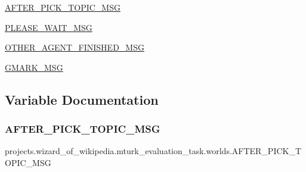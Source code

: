 \begin{DoxyCompactItemize}
\item 
\hyperlink{namespaceprojects_1_1wizard__of__wikipedia_1_1mturk__evaluation__task_1_1worlds_aa0e1a342f63e6a49443fff0e08549641}{A\+F\+T\+E\+R\+\_\+\+P\+I\+C\+K\+\_\+\+T\+O\+P\+I\+C\+\_\+\+M\+SG}
\item 
\hyperlink{namespaceprojects_1_1wizard__of__wikipedia_1_1mturk__evaluation__task_1_1worlds_afa02d5fb178b81a003bb49b9ff549d32}{P\+L\+E\+A\+S\+E\+\_\+\+W\+A\+I\+T\+\_\+\+M\+SG}
\item 
\hyperlink{namespaceprojects_1_1wizard__of__wikipedia_1_1mturk__evaluation__task_1_1worlds_a391a193155277d10fba60c900c198406}{O\+T\+H\+E\+R\+\_\+\+A\+G\+E\+N\+T\+\_\+\+F\+I\+N\+I\+S\+H\+E\+D\+\_\+\+M\+SG}
\item 
\hyperlink{namespaceprojects_1_1wizard__of__wikipedia_1_1mturk__evaluation__task_1_1worlds_ab04ab0217ac0482b7c69a5d546c715fc}{G\+M\+A\+R\+K\+\_\+\+M\+SG}
\end{DoxyCompactItemize}


\subsection{Variable Documentation}
\mbox{\label{namespaceprojects_1_1wizard__of__wikipedia_1_1mturk__evaluation__task_1_1worlds_aa0e1a342f63e6a49443fff0e08549641}} 
\subsubsection{\texorpdfstring{A\+F\+T\+E\+R\+\_\+\+P\+I\+C\+K\+\_\+\+T\+O\+P\+I\+C\+\_\+\+M\+SG}{AFTER\_PICK\_TOPIC\_MSG}}
{\footnotesize\ttfamily projects.\+wizard\+\_\+of\+\_\+wikipedia.\+mturk\+\_\+evaluation\+\_\+task.\+worlds.\+A\+F\+T\+E\+R\+\_\+\+P\+I\+C\+K\+\_\+\+T\+O\+P\+I\+C\+\_\+\+M\+SG}



